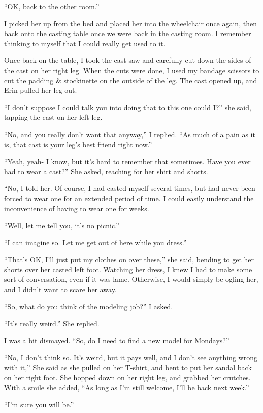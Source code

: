 ``OK, back to the other room.''

I picked her up from the bed and placed her into the wheelchair once again, then back onto
the casting table once we were back in the casting room. I remember thinking to myself that I
could really get used to it.

Once back on the table, I took the cast saw and carefully cut down the sides of the cast on
her right leg. When the cuts were done, I used my bandage scissors to cut the padding \&
stockinette on the outside of the leg. The cast opened up, and Erin pulled her leg out.

``I don't suppose I could talk you into doing that to this one could I?'' she said, tapping
the cast on her left leg.

``No, and you really don't want that anyway,'' I replied. ``As much of a pain as it is, that
cast is your leg's best friend right now.''

``Yeah, yeah- I know, but it's hard to remember that sometimes. Have you ever had to wear a
cast?'' She asked, reaching for her shirt and shorts.

``No, I told her. Of course, I had casted myself several times, but had never been forced to
wear one for an extended period of time. I could easily understand the inconvenience of having
to wear one for weeks.

``Well, let me tell you, it's no picnic.''

``I can imagine so. Let me get out of here while you dress.''

``That's OK, I'll just put my clothes on over these,'' she said, bending to get her shorts
over her casted left foot. Watching her dress, I knew I had to make some sort of conversation,
even if it was lame. Otherwise, I would simply be ogling her, and I didn't want to scare her
away.

``So, what do you think of the modeling job?'' I asked.

``It's really weird.'' She replied.

I was a bit dismayed. ``So, do I need to find a new model for Mondays?''

``No, I don't think so. It's weird, but it pays well, and I don't see anything wrong with
it,'' She said as she pulled on her T-shirt, and bent to put her sandal back on her right foot.
She hopped down on her right leg, and grabbed her crutches. With a smile she added, ``As long as
I'm still welcome, I'll be back next week.''

``I'm sure you will be.''

